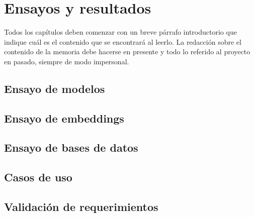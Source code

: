 
\chapter{Ensayos y resultados} %

\label{Chapter4} %


Todos los capítulos deben comenzar con un breve párrafo introductorio que indique cuál es el contenido que se encontrará al leerlo.  La redacción sobre el contenido de la memoria debe hacerse en presente y todo lo referido al proyecto en pasado, siempre de modo impersonal.

\section{Ensayo de modelos}
 
\section{Ensayo de embeddings}

\section{Ensayo de bases de datos}

\section{Casos de uso}

\section{Validación de requerimientos}

